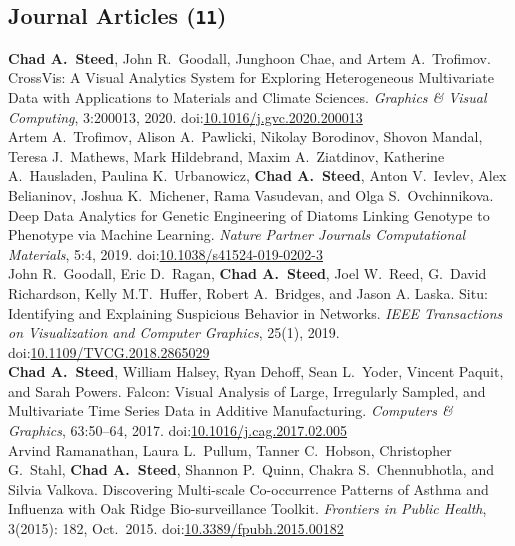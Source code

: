 \documentclass[11pt, letterpaper]{article}
\newcommand{\years}[1]{\marginnote{\scriptsize #1}}
\begin{document}
\subsection*{Journal Articles (\texttt{11})}
\begin{sloppypar}
\noindent\years{2020} \textbf{Chad A.\ Steed}, John R.\ Goodall, Junghoon Chae, and Artem A.\ Trofimov. CrossVis: A Visual Analytics System for Exploring Heterogeneous Multivariate Data with Applications to Materials and Climate Sciences. \emph{Graphics \& Visual Computing}, 3:200013, 2020. doi:\href{https://doi.org/10.1016/j.gvc.2020.200013}{10.1016/j.gvc.2020.200013}\\
\years{2019}Artem A.\ Trofimov, Alison A.\ Pawlicki, Nikolay Borodinov, Shovon Mandal, Teresa J.\ Mathews, Mark Hildebrand, Maxim A.\ Ziatdinov, Katherine A.\ Hausladen, Paulina K.\ Urbanowicz, \textbf{Chad A.\ Steed}, Anton V.\ Ievlev, Alex Belianinov, Joshua K.\ Michener, Rama Vasudevan, and Olga S.\ Ovchinnikova. Deep Data Analytics for Genetic Engineering of Diatoms Linking Genotype to Phenotype via Machine Learning. \emph{Nature Partner Journals Computational Materials}, 5:4, 2019. doi:\href{https://doi.org/10.1038/s41524-019-0202-3}
{10.1038/s41524-019-0202-3}\\
\years{2019}John R.\ Goodall, Eric D.\ Ragan, \textbf{Chad A.\ Steed},
Joel W.\ Reed, G.\ David Richardson, Kelly M.T.\ Huffer, Robert A.\ Bridges, and Jason A. Laska. Situ: Identifying and Explaining Suspicious Behavior in Networks. \emph{IEEE Transactions on Visualization and Computer Graphics}, 25(1), 2019. doi:\href{http://dx.doi.org/10.1109/TVCG.2018.2865029}
{10.1109/TVCG.2018.2865029}\\
\years{2017}\textbf{Chad A.\ Steed}, William Halsey, Ryan Dehoff,
Sean L.\ Yoder, Vincent Paquit, and Sarah Powers.  Falcon: Visual Analysis of Large, Irregularly Sampled, and Multivariate Time Series Data in Additive Manufacturing. \emph{Computers \& Graphics}, 63:50--64, 2017. doi:\href{http://dx.doi.org/10.1016/j.cag.2017.02.005}
{10.1016/j.cag.2017.02.005}\\
\years{2015}Arvind Ramanathan, Laura L.\ Pullum, Tanner C.\ Hobson,
Christopher G.\ Stahl, \textbf{Chad A.\ Steed}, Shannon P.\ Quinn,
Chakra S.\ Chennubhotla, and Silvia Valkova.  Discovering Multi-scale
Co-occurrence Patterns of Asthma and Influenza with Oak Ridge Bio-surveillance
Toolkit. \emph{Frontiers in Public Health}, 3(2015): 182, Oct.\ 2015.
doi:\href{http://dx.doi.org/10.3389/fpubh.2015.00182}
{10.3389/fpubh.2015.00182}\\

\end{sloppypar}
\end{document}
